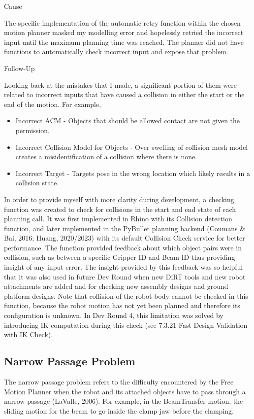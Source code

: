 \begin{itemize}
\begin{enumerate}
Cause

The specific implementation of the automatic retry function within the chosen motion planner masked my modelling error and hopelessly retried the incorrect input until the maximum planning time was reached. The planner did not have functions to automatically check incorrect input and expose that problem.

Follow-Up

Looking back at the mistakes that I made, a significant portion of them were related to incorrect inputs that have caused a collision in either the start or the end of the motion. For example, 
\begin{itemize}
\item Incorrect ACM - Objects that should be allowed contact are not given the permission.
\item Incorrect Collision Model for Objects - Over swelling of collision mesh model creates a misidentification of a collision where there is none.
\item Incorrect Target - Targets pose in the wrong location which likely results in a collision state.
\end{itemize}

In order to provide myself with more clarity during development, a checking function was created to check for collisions in the start and end state of each planning call. It was first implemented in Rhino with its Collision detection function, and later implemented in the PyBullet planning backend (Coumans & Bai, 2016; Huang, 2020/2023) with its default Collision Check service for better performance. The function provided feedback about which object pairs were in collision, such as between a specific Gripper ID and Beam ID thus providing insight of any input error.
The insight provided by this feedback was so helpful that it was also used in future Dev Round when new DiRT tools and new robot attachments are added and for checking new assembly designs and ground platform designs. 
Note that collision of the robot body cannot be checked in this function, because the robot motion has not yet been planned and therefore its configuration is unknown. In Dev Round 4, this limitation was solved by introducing IK computation during this check (see 7.3.21 Fast Design Validation with IK Check).

\subsection{Narrow Passage Problem}
The narrow passage problem refers to the difficulty encountered by the Free Motion Planner when the robot and its attached objects have to pass through a narrow passage (LaValle, 2006). For example, in the BeamTransfer motion, the sliding motion for the beam to go inside the clamp jaw before the clamping. 


\end{enumerate}
\end{itemize}
